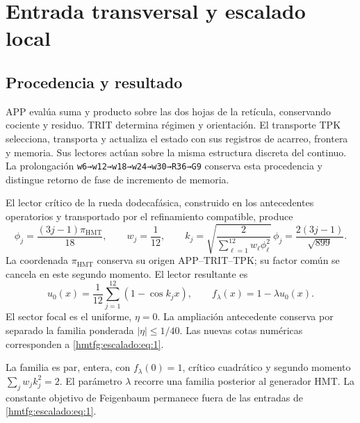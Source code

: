\section{Entrada transversal y escalado local}
\label{hmtfg:fragmento:entrada-transversal-y-escalado-local}

\subsection{Procedencia y resultado}
\label{hmtfg:escalado:1}

APP evalúa suma y producto sobre las dos hojas de la retícula, conservando cociente y residuo. TRIT determina régimen y orientación. El transporte TPK selecciona, transporta y actualiza el estado con sus registros de acarreo, frontera y memoria. Sus lectores actúan sobre la misma estructura discreta del continuo. La prolongación \texttt{w6→w12→w18→w24→w30→R36→G9} conserva esta procedencia y distingue retorno de fase de incremento de memoria.

El lector crítico de la rueda dodecafásica, construido en los antecedentes operatorios y transportado por el refinamiento compatible, produce
\[
\phi_j=\frac{(3j-1)\pi_{\mathrm{HMT}}}{18},\qquad
w_j=\frac1{12},\qquad
k_j=\sqrt{\frac2{\sum_{\ell=1}^{12}w_\ell\phi_\ell^2}}\,\phi_j
=\frac{2(3j-1)}{\sqrt{899}}.
\]
La coordenada \(\pi_{\mathrm{HMT}}\) conserva su origen APP–TRIT–TPK; su factor común se cancela en este segundo momento. El lector resultante es
\begin{equation}
u_0(x)=\frac1{12}\sum_{j=1}^{12}(1-\cos k_jx),\qquad
f_\lambda(x)=1-\lambda u_0(x).
\label{hmtfg:escalado:eq:1}
\end{equation}
El sector focal es el uniforme, \(\eta=0\). La ampliación antecedente conserva por separado la familia ponderada \(|\eta|\le1/40\). Las nuevas cotas numéricas corresponden a \eqref{hmtfg:escalado:eq:1}.

La familia es par, entera, con \(f_\lambda(0)=1\), crítico cuadrático y segundo momento \(\sum_jw_jk_j^2=2\). El parámetro \(\lambda\) recorre una familia posterior al generador HMT. La constante objetivo de Feigenbaum permanece fuera de las entradas de \eqref{hmtfg:escalado:eq:1}.

